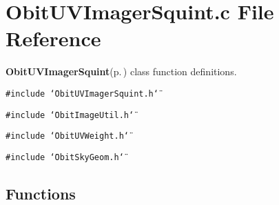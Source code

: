 \section{Obit\-UVImager\-Squint.c File Reference}
\label{ObitUVImagerSquint_8c}
{\bf Obit\-UVImager\-Squint}{\rm (p.\,\pageref{structObitUVImagerSquint})} class function definitions. 

{\tt \#include \char`\"{}Obit\-UVImager\-Squint.h\char`\"{}}\par
{\tt \#include \char`\"{}Obit\-Image\-Util.h\char`\"{}}\par
{\tt \#include \char`\"{}Obit\-UVWeight.h\char`\"{}}\par
{\tt \#include \char`\"{}Obit\-Sky\-Geom.h\char`\"{}}\par
\subsection*{Functions}
